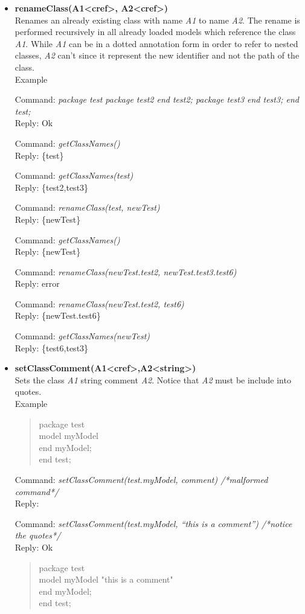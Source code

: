 \documentclass[11pt,a4paper,oneside,english]{book}
\newenvironment{modelicaExamples}{\begin{itemize}}{\end{itemize}}
\newcommand{\api}[2]{\item \textbf{#1} \\ #2}
\newcommand{\tab}{\hspace{2em}}
\newcommand{\command}[1]{Command: \textit{#1}\\}
\newcommand{\reply}[1]{Reply: #1}
\newcommand{\functionex}[2]{\begin{singlespace} \command{#1} \reply{#2} \end{singlespace}}
\newcommand{\examples}{Example}
\newenvironment{mocode}{\begin{verse}\begin{singlespace}\begin{scriptsize}\ttfamily}{\end{scriptsize}\end{singlespace}\end{verse}}
\begin{document}
\begin{modelicaExamples}
{		\functionex{deleteClass(test)}
		{true}
		
		\functionex{getClassNames()}
		{\{\}}
		}
		
		\api{renameClass(A1<cref>, A2<cref>)}{Renames an already existing class with name \textit{A1} to name \textit{A2}. The rename is performed recursively in all already loaded models which reference the class \textit{A1}.
		While \textit{A1} can be in a dotted annotation form in order to refer to nested classes, \textit{A2} can't since it represent the new identifier and not the path of the class.\\
		\examples
		\functionex{package test package test2 end test2; package test3 end test3; end test;}
		{Ok}
		
		\functionex{getClassNames()}
		{\{test\}}
		
		\functionex{getClassNames(test)}
		{\{test2,test3\}}
	
		\functionex{renameClass(test, newTest)}
		{\{newTest\}}
		
		\functionex{getClassNames()}
		{\{newTest\}}
		
		\functionex{renameClass(newTest.test2, newTest.test3.test6)}
		{error}
		
		\functionex{renameClass(newTest.test2, test6)}
		{\{newTest.test6\}}
		
		\functionex{getClassNames(newTest)}
		{\{test6,test3\}}
		
		}
		
		\api{setClassComment(A1<cref>,A2<string>)}{Sets the class \textit{A1} string comment \textit{A2}.
		Notice that \textit{A2} must be include into quotes.\\
		\examples
		\begin{mocode}
		 package test \\
		 \tab model myModel \\
		\tab end myModel; \\
		end test; \\
		\end{mocode}
		\functionex{setClassComment(test.myModel, comment)  /*malformed command*/}
		{}
		
		\functionex{setClassComment(test.myModel, ``this is a comment'') /*notice the quotes*/}
		{Ok}
		\begin{mocode}
		package test \\
		\tab model myModel "this is a comment" \\
		\tab end myModel; \\
		end test; \\
		\end{mocode}
		
}
\end{modelicaExamples}
\end{document}
